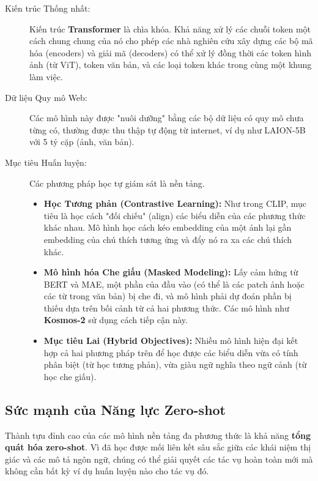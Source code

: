 \begin{description}
	\item[Kiến trúc Thống nhất:] Kiến trúc \textbf{Transformer} là chìa khóa. Khả năng xử lý các chuỗi token một cách chung chung của nó cho phép các nhà nghiên cứu xây dựng các bộ mã hóa (encoders) và giải mã (decoders) có thể xử lý đồng thời các token hình ảnh (từ ViT), token văn bản, và các loại token khác trong cùng một khung làm việc.
	
	\item[Dữ liệu Quy mô Web:] Các mô hình này được "nuôi dưỡng" bằng các bộ dữ liệu có quy mô chưa từng có, thường được thu thập tự động từ internet, ví dụ như LAION-5B với 5 tỷ cặp (ảnh, văn bản).
	
	\item[Mục tiêu Huấn luyện:] Các phương pháp học tự giám sát là nền tảng.
	\begin{itemize}
		\item \textbf{Học Tương phản (Contrastive Learning):} Như trong CLIP, mục tiêu là học cách "đối chiếu" (align) các biểu diễn của các phương thức khác nhau. Mô hình học cách kéo embedding của một ảnh lại gần embedding của chú thích tương ứng và đẩy nó ra xa các chú thích khác.
		\item \textbf{Mô hình hóa Che giấu (Masked Modeling):} Lấy cảm hứng từ BERT và MAE, một phần của đầu vào (có thể là các patch ảnh hoặc các từ trong văn bản) bị che đi, và mô hình phải dự đoán phần bị thiếu dựa trên bối cảnh từ cả hai phương thức. Các mô hình như \textbf{Kosmos-2} sử dụng cách tiếp cận này.
		\item \textbf{Mục tiêu Lai (Hybrid Objectives):} Nhiều mô hình hiện đại kết hợp cả hai phương pháp trên để học được các biểu diễn vừa có tính phân biệt (từ học tương phản), vừa giàu ngữ nghĩa theo ngữ cảnh (từ học che giấu).
	\end{itemize}
\end{description}

\subsection{Sức mạnh của Năng lực Zero-shot}
\label{subsec:zero_shot_capability}
Thành tựu đỉnh cao của các mô hình nền tảng đa phương thức là khả năng \textbf{tổng quát hóa zero-shot}. Vì đã học được mối liên kết sâu sắc giữa các khái niệm thị giác và các mô tả ngôn ngữ, chúng có thể giải quyết các tác vụ hoàn toàn mới mà không cần bất kỳ ví dụ huấn luyện nào cho tác vụ đó.

